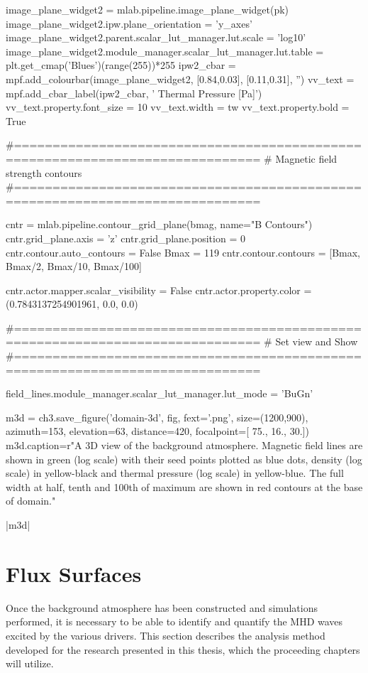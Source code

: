\begin{pycode}[chapter3a]
image_plane_widget2 = mlab.pipeline.image_plane_widget(pk)
image_plane_widget2.ipw.plane_orientation = 'y_axes'
image_plane_widget2.parent.scalar_lut_manager.lut.scale = 'log10'
image_plane_widget2.module_manager.scalar_lut_manager.lut.table = plt.get_cmap('Blues')(range(255))*255
ipw2_cbar = mpf.add_colourbar(image_plane_widget2, [0.84,0.03], [0.11,0.31], '')
vv_text = mpf.add_cbar_label(ipw2_cbar, '   Thermal Pressure [Pa]')
vv_text.property.font_size = 10
vv_text.width = tw
vv_text.property.bold = True

#==============================================================================
# Magnetic field strength contours
#==============================================================================

cntr = mlab.pipeline.contour_grid_plane(bmag, name="B Contours")
cntr.grid_plane.axis = 'z'
cntr.grid_plane.position = 0
cntr.contour.auto_contours = False
Bmax = 119
cntr.contour.contours = [Bmax, Bmax/2, Bmax/10, Bmax/100]

cntr.actor.mapper.scalar_visibility = False
cntr.actor.property.color = (0.7843137254901961, 0.0, 0.0)

#==============================================================================
# Set view and Show
#==============================================================================

field_lines.module_manager.scalar_lut_manager.lut_mode = 'BuGn'

m3d = ch3.save_figure('domain-3d', fig, fext='.png', size=(1200,900),
                      azimuth=153, elevation=63, distance=420,
                      focalpoint=[ 75.,  16.,  30.])
m3d.caption=r"A 3D view of the background atmosphere. Magnetic field lines are shown in green (log scale) with their seed points plotted as blue dots, density (log scale) in yellow-black and thermal pressure (log scale) in yellow-blue. The full width at half, tenth and 100th of maximum are shown in red contours at the base of domain."
\end{pycode}

\py[chapter3a]|m3d|

\section{Flux Surfaces}\label{sec:fluxsurfaces}

Once the background atmosphere has been constructed and simulations performed, it is necessary to be able to identify and quantify the MHD waves excited by the various drivers.
This section describes the analysis method developed for the research presented in this thesis, which the proceeding chapters will utilize.

